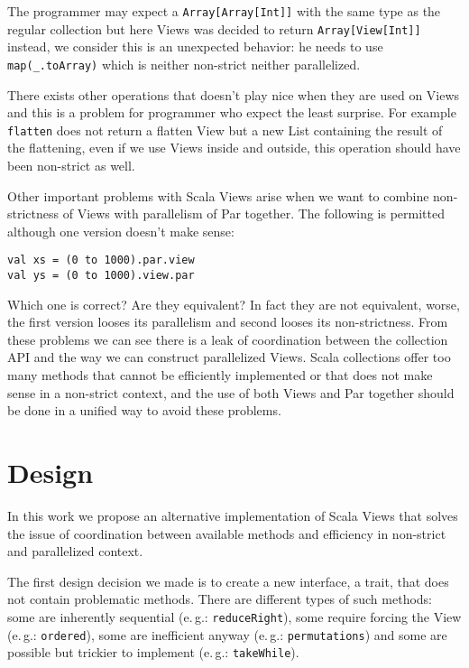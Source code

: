 \documentclass[a4paper,12pt,twocolumn]{article}
\newcommand{\eg}{e.\,g.}
\begin{document}
The programmer may expect a \verb|Array[Array[Int]]| with the same type as the regular collection but here Views was decided to return \verb|Array[View[Int]]| instead, we consider this is an unexpected behavior: he needs to use \verb|map(_.toArray)| which is neither non-strict neither parallelized.

There exists other operations that doesn't play nice when they are used on Views and this is a problem for programmer who expect the least surprise.
For example \verb|flatten| does not return a flatten View but a new List containing the result of the flattening, even if we use Views inside and outside, this operation should have been non-strict as well.

Other important problems with Scala Views arise when we want to combine non-strictness of Views with parallelism of Par together.
The following is permitted although one version doesn't make sense:

\begin{lstlisting}
val xs = (0 to 1000).par.view
val ys = (0 to 1000).view.par
\end{lstlisting}

Which one is correct? Are they equivalent? In fact they are not equivalent, worse, the first version looses its parallelism and second looses its non-strictness.
From these problems we can see there is a leak of coordination between the collection API and the way we can construct parallelized Views.
Scala collections offer too many methods that cannot be efficiently implemented or that does not make sense in a non-strict context, and the use of both Views and Par together should be done in a unified way to avoid these problems.


\section{Design}
In this work we propose an alternative implementation of Scala Views that solves the issue of coordination between available methods and efficiency in non-strict and parallelized context.

The first design decision we made is to create a new interface, a trait, that does not contain problematic methods.
There are different types of such methods: some are inherently sequential (\eg: \verb|reduceRight|), some require forcing the View (\eg: \verb|ordered|), some are inefficient anyway (\eg: \verb|permutations|) and some are possible but trickier to implement (\eg: \verb|takeWhile|).
\end{document}
